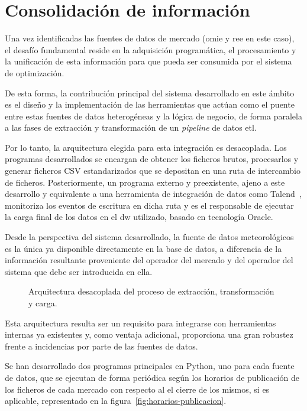 \section{Consolidación de información}
\label{makereference4.4}

Una vez identificadas las fuentes de datos de mercado (\gls{omie} y \gls{ree} en este caso), el desafío fundamental reside en la adquisición programática, el procesamiento y la unificación de esta información para que pueda ser consumida por el sistema de optimización.

De esta forma, la contribución principal del sistema desarrollado en este ámbito es el diseño y la implementación de las herramientas que actúan como el puente entre estas fuentes de datos heterogéneas y la lógica de negocio, de forma paralela a las fases de extracción y transformación de un \textit{pipeline} de datos \gls{etl}.

Por lo tanto, la arquitectura elegida para esta integración es desacoplada. Los programas desarrollados se encargan de obtener los ficheros brutos, procesarlos y generar ficheros CSV estandarizados que se depositan en una ruta de intercambio de ficheros. Posteriormente, un programa externo y preexistente, ajeno a este desarrollo y equivalente a una herramienta de integración de datos como Talend~\cite{talend2025modern}, monitoriza los eventos de escritura en dicha ruta y es el responsable de ejecutar la carga final de los datos en el \gls{dw} utilizado, basado en tecnología Oracle.

Desde la perspectiva del sistema desarrollado, la fuente de datos meteorológicos es la única ya disponible directamente en la base de datos, a diferencia de la información resultante proveniente del operador del mercado y del operador del sistema que debe ser introducida en ella.

\begin{figure}
  \centering
  \caption[Arquitectura desacoplada del proceso de datos.]{Arquitectura desacoplada del proceso de extracción, transformación y carga.}
  \label{fig:arquitectura-mercado}
\end{figure}

Esta arquitectura resulta ser un requisito para integrarse con herramientas internas ya existentes y, como ventaja adicional, proporciona una gran robustez frente a incidencias por parte de las fuentes de datos.

Se han desarrollado dos programas principales en Python, uno para cada fuente de datos, que se ejecutan de forma periódica según los horarios de publicación de los ficheros de cada mercado con respecto al el cierre de los mismos, si es aplicable, representado en la figura~\ref{fig:horarios-publicacion}.

